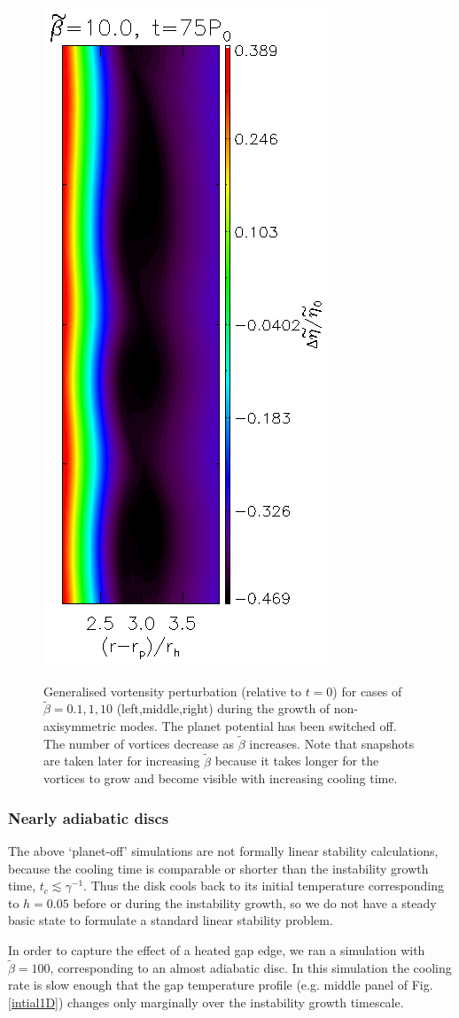 \begin{figure}
{    \includegraphics[width=0.3\linewidth]{figures/analysis_gvortensity75}
  }  
  \caption{Generalised vortensity perturbation (relative to $t=0$) for
    cases of $\tilde{\beta}=0.1,1,10$ (left,middle,right) during
    the growth of non-axisymmetric modes. The planet potential has
    been switched off.  The number of vortices
    decrease as $\tilde{\beta}$ increases. Note that snapshots are
    taken later for increasing $\tilde{\beta}$ because it takes longer
    for the vortices to grow and become visible with increasing cooling time. 
    \label{2Dlinear} 
  } 
\end{figure}

\subsubsection{Nearly adiabatic discs}
\label{adiabatic_section}

The above `planet-off' simulations are not formally linear
stability calculations, because the cooling time is comparable or shorter
than the instability growth time, $t_c\lesssim\gamma^{-1}$.  
Thus the disk cools back to its initial temperature corresponding to
$h=0.05$ before or during the instability growth, so we do not 
have a steady basic state to formulate a standard linear stability 
problem. 

In order to capture the effect of a heated gap edge, we ran a simulation with 
$\tilde{\beta}=100$, corresponding to an almost adiabatic disc.  
In this simulation the cooling rate is slow enough that the gap 
temperature profile (e.g. middle panel of Fig. \ref{intial1D}) changes
only marginally over the instability growth timescale. 

